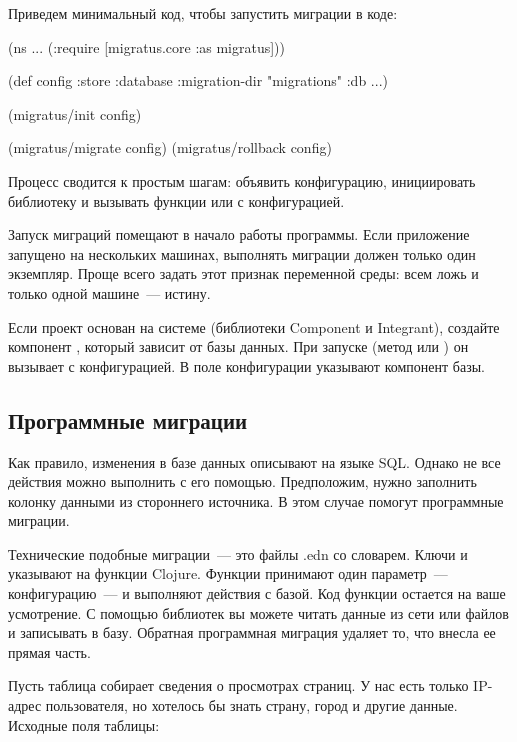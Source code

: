 Приведем минимальный код, чтобы запустить миграции в коде:

\begin{english}
  \begin{clojure}
(ns ...
  (:require
   [migratus.core :as migratus]))

(def config
  {:store :database
   :migration-dir "migrations"
   :db {...}})

(migratus/init config)

(migratus/migrate config)
(migratus/rollback config)
  \end{clojure}
\end{english}

Процесс сводится к простым шагам: объявить конфигурацию, инициировать библиотеку и вызывать функции  или  с конфигурацией.

Запуск миграций помещают в начало работы программы. Если приложение запущено на нескольких машинах, выполнять миграции должен только один экземпляр. Проще всего задать этот признак переменной среды: всем ложь и только одной машине~--- истину.

Если проект основан на системе (библиотеки Component и Integrant), создайте компонент , который зависит от базы данных. При запуске (метод  или ) он вызывает  с конфигурацией. В поле  конфигурации указывают компонент базы.

\subsection{Программные миграции}

Как правило, изменения в базе данных описывают на языке SQL. Однако не все действия можно выполнить с его помощью. Предположим, нужно заполнить колонку данными из стороннего источника. В этом случае помогут программные миграции.

Технические подобные миграции~--- это файлы .edn со словарем. Ключи  и  указывают на функции Clojure. Функции принимают один параметр~--- конфигурацию~--- и выполняют действия с базой. Код функции остается на ваше усмотрение. С помощью библиотек вы можете читать данные из сети или файлов и записывать в базу. Обратная программная миграция удаляет то, что внесла ее прямая часть.

Пусть таблица  собирает сведения о просмотрах страниц. У нас есть только IP-адрес пользователя, но хотелось бы знать страну, город и другие данные. Исходные поля таблицы:

